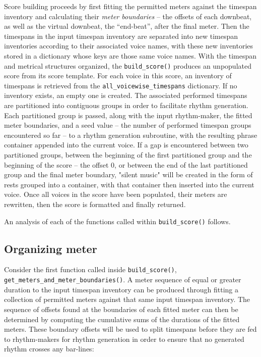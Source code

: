 \noindent Score building proceeds by first fitting the permitted meters against
the timespan inventory and calculating their \emph{meter boundaries} -- the
offsets of each downbeat, as well as the virtual downbeat, the
\enquote{end-beat}, after the final meter. Then the timespans in the input
timespan inventory are separated into new timespan inventories according to
their associated voice names, with these new inventories stored in a dictionary
whose keys are those same voice names. With the timespan and metrical
structures organized, the \texttt{build\_score()} produces an unpopulated score
from its score template. For each voice in this score, an inventory of
timespans is retrieved from the \texttt{all\_voicewise\_timespans} dictionary.
If no inventory exists, an empty one is created. The associated performed
timespans are partitioned into contiguous groups in order to facilitate rhythm
generation. Each partitioned group is passed, along with the input
rhythm-maker, the fitted meter boundaries, and a seed value -- the number of
performed timespan groups encountered so far -- to a rhythm generation
subroutine, with the resulting phrase container appended into the current
voice. If a gap is encountered between two partitioned groups, between the
beginning of the first partitioned group and the beginning of the score -- the
offset 0, or between the end of the last partitioned group and the final meter
boundary, "silent music" will be created in the form of rests grouped into a
container, with that container then inserted into the current voice. Once all
voices in the score have been populated, their meters are rewritten, then the
score is formatted and finally returned.

An analysis of each of the functions called within \texttt{build\_score()}
follows.

\subsection{Organizing meter}

Consider the first function called inside \texttt{build\_score()},
\texttt{get\_meters\_and\_meter\_boundaries()}. A meter sequence of equal or
greater duration to the input timespan inventory can be produced through
fitting a collection of permitted meters against that same input timespan
inventory. The sequence of offsets found at the boundaries of each fitted meter
can then be determined by computing the cumulative sums of the durations of the
fitted meters. These boundary offsets will be used to split timespans before
they are fed to rhythm-makers for rhythm generation in order to ensure that no
generated rhythm crosses any bar-lines:

